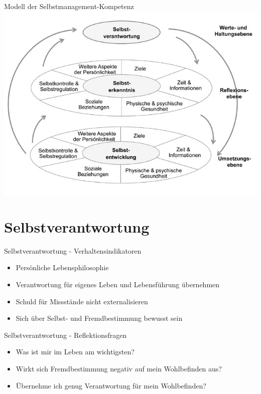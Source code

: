 
\begin{frame}[c]{Modell der Selbstmanagement-Kompetenz}
    \includegraphics[width=\textwidth]{modell.jpeg}
\end{frame}


\section{Selbstverantwortung}

\begin{frame}[c]{Selbstverantwortung - Verhaltensindikatoren}
    \begin{itemize}
    \item Persönliche Lebensphilosophie
    \pause
    \item Verantwortung für eigenes Leben und Lebensführung übernehmen
    \pause
    \item Schuld für Missstände nicht externalisieren
    \pause
    \item Sich über Selbst- und Fremdbestimmung bewusst sein
    \end{itemize}
\end{frame}


\begin{frame}[c]{Selbstverantwortung - Reflektionsfragen}
    \begin{itemize}
    \item Was ist mir im Leben am wichtigsten? \newline
    \pause
    \item Wirkt sich Fremdbestimmung negativ auf mein Wohlbefinden aus? \newline
    \pause
    \item Übernehme ich genug Verantwortung für mein Wohlbefinden?
    \end{itemize}
\end{frame}


